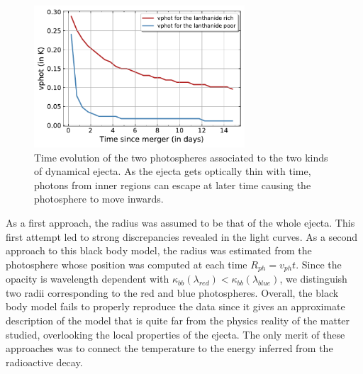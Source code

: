 \documentclass[a4paper, twoside, 11pt]{article}
\numberwithin{equation}{section}
\begin{document}
 \begin{figure}[h!]
 \centering
 \includegraphics[width=0.7\textwidth]{pictures/vphot_red_photons.pdf}
 \caption[Time evolution of photospheres in kilonova]{Time evolution of the two photospheres associated to the two kinds of dynamical ejecta. As the ejecta gets optically thin with time, photons from inner regions can escape at later time causing the photosphere to move inwards.}
 \label{fig:vphot}
\end{figure}  
 
  As a first approach, the radius was assumed to be that of the whole ejecta.  This first attempt led to strong discrepancies revealed in the light curves. As a second approach to this black body model, the radius was estimated from the photosphere whose position was computed at each time $R_{ph} = v_{ph} t$. Since the opacity is wavelength dependent with $\kappa_{bb}(\lambda_{red}) < \kappa_{bb}({\lambda_{blue}})$, we  distinguish two radii corresponding to the red and blue photospheres. Overall, the black body model fails to properly reproduce the data since it gives an approximate description of the model that is quite far from the physics reality of the matter studied, overlooking the local properties of the ejecta. The only merit of these approaches was to connect the temperature to the energy inferred from the radioactive decay. 
 
\end{document}
